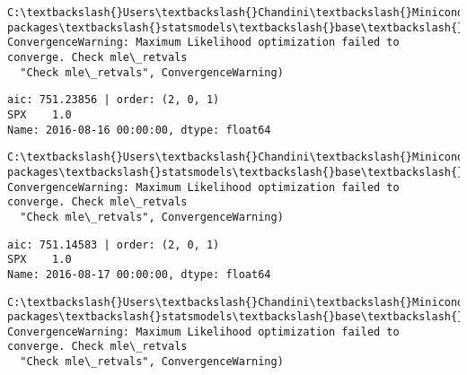 \documentclass[11pt]{article}
\begin{document}
    \begin{Verbatim}[commandchars=\\\{\}]
C:\textbackslash{}Users\textbackslash{}Chandini\textbackslash{}Miniconda3\textbackslash{}envs\textbackslash{}auquan\textbackslash{}lib\textbackslash{}site-packages\textbackslash{}statsmodels\textbackslash{}base\textbackslash{}model.py:496: ConvergenceWarning: Maximum Likelihood optimization failed to converge. Check mle\_retvals
  "Check mle\_retvals", ConvergenceWarning)

    \end{Verbatim}

    \begin{Verbatim}[commandchars=\\\{\}]
aic: 751.23856 | order: (2, 0, 1)
SPX    1.0
Name: 2016-08-16 00:00:00, dtype: float64

    \end{Verbatim}

    \begin{Verbatim}[commandchars=\\\{\}]
C:\textbackslash{}Users\textbackslash{}Chandini\textbackslash{}Miniconda3\textbackslash{}envs\textbackslash{}auquan\textbackslash{}lib\textbackslash{}site-packages\textbackslash{}statsmodels\textbackslash{}base\textbackslash{}model.py:496: ConvergenceWarning: Maximum Likelihood optimization failed to converge. Check mle\_retvals
  "Check mle\_retvals", ConvergenceWarning)

    \end{Verbatim}

    \begin{Verbatim}[commandchars=\\\{\}]
aic: 751.14583 | order: (2, 0, 1)
SPX    1.0
Name: 2016-08-17 00:00:00, dtype: float64

    \end{Verbatim}

    \begin{Verbatim}[commandchars=\\\{\}]
C:\textbackslash{}Users\textbackslash{}Chandini\textbackslash{}Miniconda3\textbackslash{}envs\textbackslash{}auquan\textbackslash{}lib\textbackslash{}site-packages\textbackslash{}statsmodels\textbackslash{}base\textbackslash{}model.py:496: ConvergenceWarning: Maximum Likelihood optimization failed to converge. Check mle\_retvals
  "Check mle\_retvals", ConvergenceWarning)

    \end{Verbatim}
\end{document}
